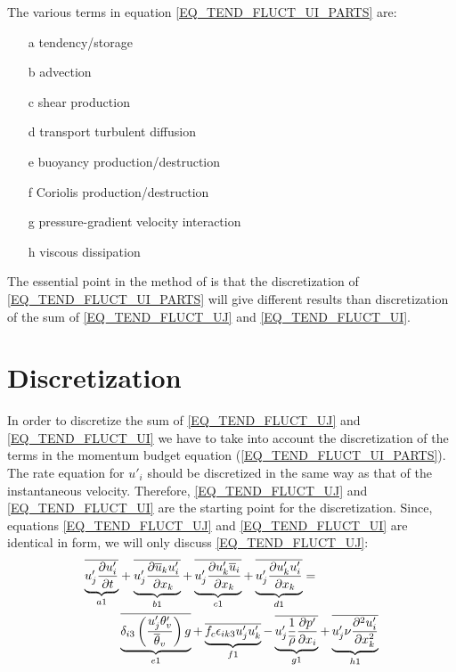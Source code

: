 \documentclass[10pt]{article}
\begin{document}
The various terms in equation \ref{EQ_TEND_FLUCT_UI_PARTS} are:
\begin{enumerate}
   \item[a] tendency/storage
   \item[b] advection
   \item[c] shear production
   \item[d] transport turbulent diffusion
   \item[e] buoyancy production/destruction
   \item[f] Coriolis production/destruction
   \item[g] pressure-gradient velocity interaction
   \item[h] viscous dissipation
\end{enumerate}

The essential point in the method of \cite{gao:balance} is that the discretization of \ref{EQ_TEND_FLUCT_UI_PARTS} 
will give different results than discretization of the sum of  \ref{EQ_TEND_FLUCT_UJ}  and  \ref{EQ_TEND_FLUCT_UI}.

\section{Discretization}

In order to discretize the sum of  \ref{EQ_TEND_FLUCT_UJ}  and  \ref{EQ_TEND_FLUCT_UI} we have to take into account the 
discretization of the terms in the momentum budget equation (\ref{EQ_TEND_FLUCT_UI_PARTS}). The rate equation for $u'_i$ should be discretized in the same way as 
that of the instantaneous velocity. Therefore, \ref{EQ_TEND_FLUCT_UJ} and \ref{EQ_TEND_FLUCT_UI} 
are the starting point for the discretization. 
Since, equations \ref{EQ_TEND_FLUCT_UJ} and \ref{EQ_TEND_FLUCT_UI} are identical in form, we will only discuss \ref{EQ_TEND_FLUCT_UJ}:
\begin{equation}
\begin{split}
  \underbrace{ \overline{u'_j \frac{\partial u'_i}{\partial t}} }_{a1} & +
  \underbrace{ \overline{u'_j \frac{\partial \overline{u}_k           u'_i}{\partial{x_k}}} }_{b1} +
  \underbrace{ \overline{u'_j \frac{\partial u'_k \overline{u}_i}{\partial{x_k}}} }_{c1}+
  \underbrace{ \overline{u'_j \frac{\partial  u'_k  u'_i}{\partial{x_k}}} }_{d1} = \\
  &
  \underbrace{ \overline{\delta_{i3} \left( \frac{u'_j\theta'_v}{\overline{\theta}_v} \right) g } }_{e1} +
  \underbrace{ \overline{f_c \epsilon_{ik3} u'_j u'_k} }_{f1}-
  \underbrace{ \overline{u'_j \frac{1}{\overline{\rho}} \frac{\partial p'}{\partial x_i}} }_{g1}+ 
  \underbrace{ \overline{u'_j \nu \frac{\partial^2 u'_i}{\partial x^2_k}} }_{h1} 
\end{split}
\notag
\end{equation}
\end{document}
